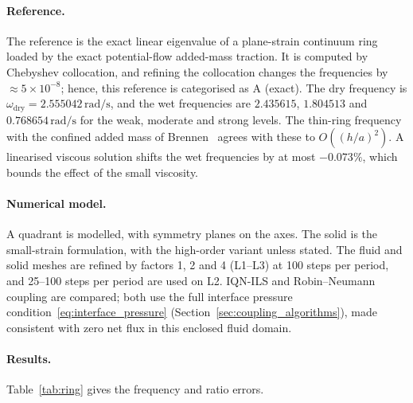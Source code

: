 \paragraph{Reference.}
The reference is the exact linear eigenvalue of a plane-strain continuum ring loaded by the exact potential-flow added-mass traction.
It is computed by Chebyshev collocation, and refining the collocation changes the frequencies by $\approx5\times10^{-8}$; hence, this reference is categorised as A (exact).
The dry frequency is $\omega_\mathrm{dry} = 2.555042\,\mathrm{rad/s}$, and the wet frequencies are $2.435615$, $1.804513$ and $0.768654\,\mathrm{rad/s}$ for the weak, moderate and strong levels.
The thin-ring frequency with the confined added mass of Brennen~\citep{Brennen1982} agrees with these to $O((h/a)^2)$.
A linearised viscous solution shifts the wet frequencies by at most $-0.073\%$, which bounds the effect of the small viscosity.

\paragraph{Numerical model.}
A quadrant is modelled, with symmetry planes on the axes.
The solid is the small-strain formulation, with the high-order variant unless stated.
The fluid and solid meshes are refined by factors 1, 2 and 4 (L1--L3) at 100 steps per period, and 25--100 steps per period are used on L2.
IQN-ILS and Robin--Neumann coupling are compared; both use the full interface pressure condition~\eqref{eq:interface_pressure} (Section~\ref{sec:coupling_algorithms}), made consistent with zero net flux in this enclosed fluid domain.

\paragraph{Results.}
Table~\ref{tab:ring} gives the frequency and ratio errors.

